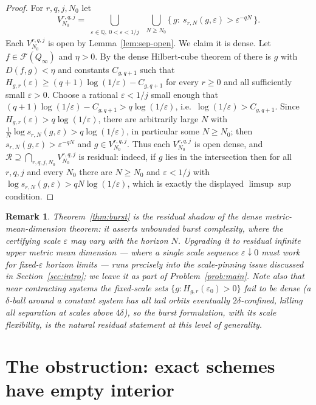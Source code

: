 \documentclass[11pt]{article}
\newtheorem{remark}[theorem]{Remark}
\newcommand{\Q}{Q_\infty}
\newcommand{\F}{\mathcal{F}}
\begin{document}
\begin{proof}
For $r,q,j,N_0$ let
\[
V^{r,q,j}_{N_0}
=\bigcup_{\substack{\varepsilon\in\mathbb Q,\ 0<\varepsilon<1/j}}
\ \bigcup_{N\ge N_0}
\bigl\{\,g:\ s_{r,N}(g,\varepsilon)>\varepsilon^{-qN}\,\bigr\}.
\]
Each $V^{r,q,j}_{N_0}$ is open by Lemma~\ref{lem:sep-open}.  We claim it is dense.
Let $f\in\F(\Q)$ and $\eta>0$.  By the dense Hilbert-cube theorem of
\cite[Theorem~3.6]{Shmalo2026} there is $g$ with $D(f,g)<\eta$ and constants
$C_{g,q+1}$ such that
$H_{g,r}(\varepsilon)\ge(q+1)\log(1/\varepsilon)-C_{g,q+1}$
for every $r\ge0$ and all sufficiently small $\varepsilon>0$.  Choose a rational
$\varepsilon<1/j$ small enough that
$(q+1)\log(1/\varepsilon)-C_{g,q+1}>q\log(1/\varepsilon)$, i.e.\
$\log(1/\varepsilon)>C_{g,q+1}$.  Since
$H_{g,r}(\varepsilon)>q\log(1/\varepsilon)$, there are arbitrarily large $N$ with
$\frac1N\log s_{r,N}(g,\varepsilon)>q\log(1/\varepsilon)$, in particular some
$N\ge N_0$; then $s_{r,N}(g,\varepsilon)>\varepsilon^{-qN}$ and $g\in V^{r,q,j}_{N_0}$.
Thus each $V^{r,q,j}_{N_0}$ is open dense, and
$\mathcal R\supseteq\bigcap_{r,q,j,N_0}V^{r,q,j}_{N_0}$
is residual: indeed, if $g$ lies in the intersection then for all $r,q,j$ and every
$N_0$ there are $N\ge N_0$ and $\varepsilon<1/j$ with
$\log s_{r,N}(g,\varepsilon)>qN\log(1/\varepsilon)$, which is exactly the displayed
$\limsup\sup$ condition.
\end{proof}

\begin{remark}
Theorem~\ref{thm:burst} is the residual shadow of the dense
metric-mean-dimension theorem: it asserts unbounded \emph{burst} complexity, where
the certifying scale $\varepsilon$ may vary with the horizon $N$.  Upgrading it to
residual infinite \emph{upper metric mean dimension} --- where a single scale sequence
$\varepsilon\downarrow0$ must work for fixed-$\varepsilon$ horizon limits --- runs
precisely into the scale-pinning issue discussed in Section~\ref{sec:intro}; we leave
it as part of Problem~\ref{prob:main}.  Note also that near contracting systems the
fixed-scale sets $\{g:H_{g,r}(\varepsilon_0)>0\}$ fail to be dense (a $\delta$-ball
around a constant system has all tail orbits eventually $2\delta$-confined, killing
all separation at scales above $4\delta$), so the burst formulation, with its
scale flexibility, is the natural residual statement at this level of generality.
\end{remark}

\section{The obstruction: exact schemes have empty interior}\label{sec:obstruction}
\end{document}
